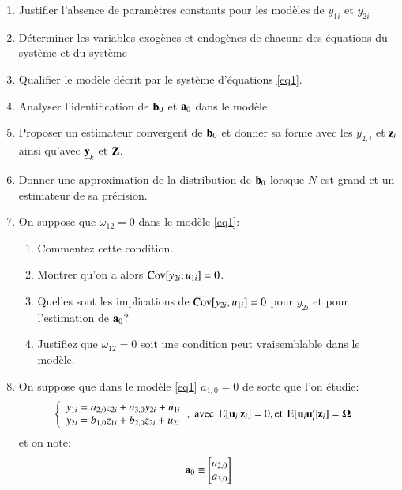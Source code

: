 \begin{enumerate}
    \item Justifier l’absence de paramètres constants pour les modèles de $y_{1i}$ et $y_{2i}$ 
    \item  Déterminer les variables exogènes et endogènes de chacune des équations
    du système et du système
    \item Qualifier le modèle décrit par le système d’équations \eqref{eq1}.
    \item Analyser l’identification de ${\mathbf b}_0$ et ${\mathbf a}_0$ dans le modèle.  
    \item Proposer un estimateur convergent de ${\mathbf b}_0$ et donner sa forme avec les $y_{2,i}$ et ${\mathbf z}_i$ 
    ainsi qu’avec $\underline{{\mathbf y}}_k$ et $\mathbf Z$.
    \item Donner une approximation de la distribution de ${\mathbf b}_0$ lorsque $N$ est grand et un estimateur de sa précision.
    \item On suppose que $\omega_{12} = 0$ dans le modèle \eqref{eq1}:
    \begin{enumerate}
        \item Commentez cette condition. 
        \item Montrer qu’on a alors $\operatorname{Cov}[y_{2i}; u_{1i}]= 0$.
        \item Quelles sont les implications de $\operatorname{Cov}[y_{2i}; u_{1i}]= 0$ pour $y_{2i}$ et pour l’estimation de ${\mathbf a}_0$?
        \item Justifiez que $\omega_{12} = 0$ soit une condition peut vraisemblable dans le modèle.
    \end{enumerate}
    \item On suppose que dans le modèle \eqref{eq1} $a_{1, 0} = 0$ de sorte que l'on étudie:
    \begin{align}
        \left\{
     \begin{array}{ll}
        y_{1i} =  a_{2,0}z_{2i} + a_{3,0}y_{2i} +u_{1i}\\
        y_{2i}= b_{1,0}z_{1i} + b_{2,0}z_{2i}+u_{2i}
     \end{array}
    \right.
    &, \ \text{avec} \  \Exp[\boldu_i|\boldz_i] =0,  \text{et} \ \Exp[\boldu_i\boldu_i^\prime|\boldz_i]=\boldOmega
    \label{eq2}
     \end{align}
     et on note:
     \[
        {\mathbf a}_0 \equiv 
        \begin{bmatrix}
            a_{2, 0}\\
            a_{3, 0}
        \end{bmatrix}
\]
\end{enumerate}
